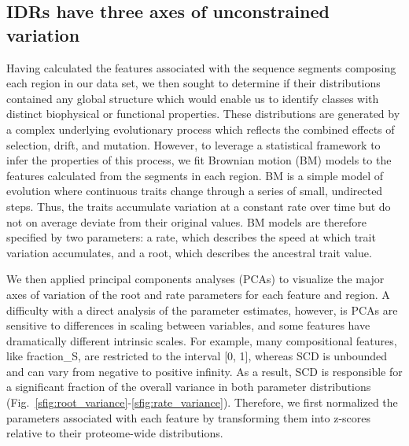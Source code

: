 \subsection{IDRs have three axes of unconstrained variation}
Having calculated the features associated with the sequence segments composing each region in our data set, we then sought to determine if their distributions contained any global structure which would enable us to identify classes with distinct biophysical or functional properties. These distributions are generated by a complex underlying evolutionary process which reflects the combined effects of selection, drift, and mutation. However, to leverage a statistical framework to infer the properties of this process, we fit Brownian motion (BM) models to the features calculated from the segments in each region. BM is a simple model of evolution where continuous traits change through a series of small, undirected steps. Thus, the traits accumulate variation at a constant rate over time but do not on average deviate from their original values. BM models are therefore specified by two parameters: a rate, which describes the speed at which trait variation accumulates, and a root, which describes the ancestral trait value.

We then applied principal components analyses (PCAs) to visualize the major axes of variation of the root and rate parameters for each feature and region. A difficulty with a direct analysis of the parameter estimates, however, is PCAs are sensitive to differences in scaling between variables, and some features have dramatically different intrinsic scales. For example, many compositional features, like fraction\_S, are restricted to the interval [0, 1], whereas SCD is unbounded and can vary from negative to positive infinity. As a result, SCD is responsible for a significant fraction of the overall variance in both parameter distributions (Fig.~\ref{sfig:root_variance}-\ref{sfig:rate_variance}). Therefore, we first normalized the parameters associated with each feature by transforming them into z-scores relative to their proteome-wide distributions.

